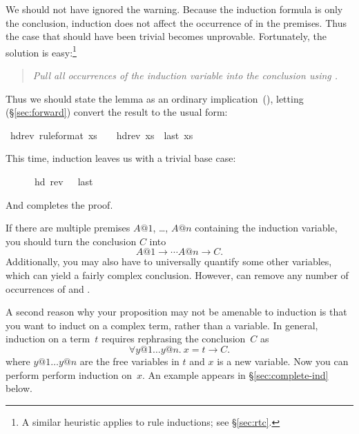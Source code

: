 \begin{isabellebody}
\begin{isamarkuptxt}
We should not have ignored the warning. Because the induction
formula is only the conclusion, induction does not affect the occurrence of  in the premises.  
Thus the case that should have been trivial
becomes unprovable. Fortunately, the solution is easy:\footnote{A similar
heuristic applies to rule inductions; see \S\ref{sec:rtc}.}
\begin{quote}
\emph{Pull all occurrences of the induction variable into the conclusion
using \isa{{\isasymlongrightarrow}}.}
\end{quote}
Thus we should state the lemma as an ordinary 
implication~(\isa{{\isasymlongrightarrow}}), letting
 (\S\ref{sec:forward}) convert the
result to the usual \isa{{\isasymLongrightarrow}} form:%
\end{isamarkuptxt}%
\ hd{\isacharunderscore}rev\ {\isacharbrackleft}rule{\isacharunderscore}format{\isacharbrackright}{\isacharcolon}\ {\isachardoublequote}xs\ {\isasymnoteq}\ {\isacharbrackleft}{\isacharbrackright}\ {\isasymlongrightarrow}\ hd{\isacharparenleft}rev\ xs{\isacharparenright}\ {\isacharequal}\ last\ xs{\isachardoublequote}%
\begin{isamarkuptxt}%
\noindent
This time, induction leaves us with a trivial base case:
\begin{isabelle}%
\ {}{\isachardot}\ {\isacharbrackleft}{\isacharbrackright}\ {\isasymnoteq}\ {\isacharbrackleft}{\isacharbrackright}\ {\isasymlongrightarrow}\ hd\ {\isacharparenleft}rev\ {\isacharbrackleft}{\isacharbrackright}{\isacharparenright}\ {\isacharequal}\ last\ {\isacharbrackleft}{\isacharbrackright}%
\end{isabelle}
And  completes the proof.

If there are multiple premises $A@1$, \dots, $A@n$ containing the
induction variable, you should turn the conclusion $C$ into
\[ A@1 \longrightarrow \cdots A@n \longrightarrow C. \]
Additionally, you may also have to universally quantify some other variables,
which can yield a fairly complex conclusion.  However,  
can remove any number of occurrences of \isa{{\isasymforall}} and
\isa{{\isasymlongrightarrow}}.%
\end{isamarkuptxt}%
%
\begin{isamarkuptext}%
%
A second reason why your proposition may not be amenable to induction is that
you want to induct on a complex term, rather than a variable. In
general, induction on a term~$t$ requires rephrasing the conclusion~$C$
as
\begin{equation}\label{eqn:ind-over-term}
\forall y@1 \dots y@n.~ x = t \longrightarrow C.
\end{equation}
where $y@1 \dots y@n$ are the free variables in $t$ and $x$ is a new variable.
Now you can perform
perform induction on~$x$. An example appears in
\S\ref{sec:complete-ind} below.


\end{isamarkuptext}
\end{isabellebody}
